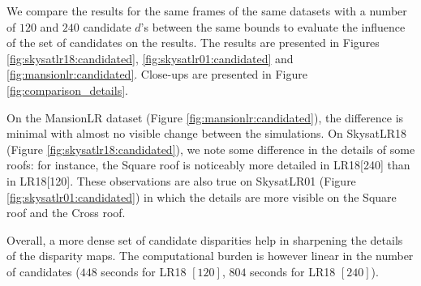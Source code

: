 \documentclass{article}
\theoremstyle{definition}
\begin{document}
We compare the results for the same frames of the same datasets with a number of $120$ and $240$ candidate $d$'s between the same bounds to evaluate the influence of the set of candidates on the results. The results are presented in Figures \ref{fig:skysatlr18:candidated}, \ref{fig:skysatlr01:candidated} and \ref{fig:mansionlr:candidated}. Close-ups are presented in Figure \ref{fig:comparison_details}.


On the MansionLR dataset (Figure \ref{fig:mansionlr:candidated}), the difference is minimal with almost no visible change between the simulations. On SkysatLR18 (Figure \ref{fig:skysatlr18:candidated}), we note some difference in the details of some roofs: for instance, the Square roof is noticeably more detailed in LR18[240] than in LR18[120]. These observations are also true on SkysatLR01 (Figure \ref{fig:skysatlr01:candidated}) in which the details are more visible on the Square roof and the Cross roof.


Overall, a more dense set of candidate disparities help in sharpening the details of the disparity maps. The computational burden is however linear in the number of candidates ($448$ seconds for LR18 $[120]$, $804$ seconds for LR18 $[240]$).
\end{document}
